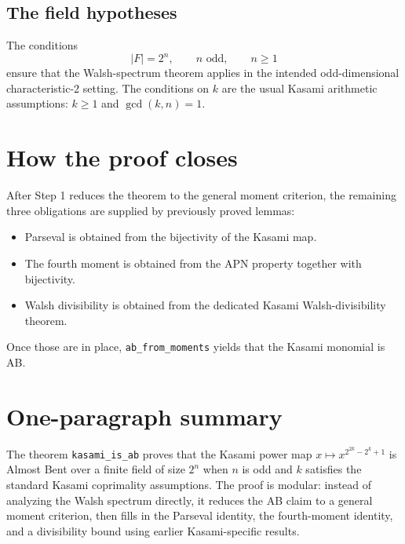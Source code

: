 \documentclass[11pt]{article}
\begin{document}
\subsection{The field hypotheses}
The conditions
\[
  |F| = 2^n, \qquad n \text{ odd}, \qquad n \ge 1
\]
ensure that the Walsh-spectrum theorem applies in the intended odd-dimensional characteristic-2 setting. The conditions on $k$ are the usual Kasami arithmetic assumptions: $k \ge 1$ and $\gcd(k,n)=1$.

\section{How the proof closes}
After Step 1 reduces the theorem to the general moment criterion, the remaining three obligations are supplied by previously proved lemmas:
\begin{itemize}
  \item Parseval is obtained from the bijectivity of the Kasami map.
  \item The fourth moment is obtained from the APN property together with bijectivity.
  \item Walsh divisibility is obtained from the dedicated Kasami Walsh-divisibility theorem.
\end{itemize}

Once those are in place, \texttt{ab\_from\_moments} yields that the Kasami monomial is AB.

\section{One-paragraph summary}
The theorem \texttt{kasami\_is\_ab} proves that the Kasami power map $x \mapsto x^{2^{2k} - 2^k + 1}$ is Almost Bent over a finite field of size $2^n$ when $n$ is odd and $k$ satisfies the standard Kasami coprimality assumptions. The proof is modular: instead of analyzing the Walsh spectrum directly, it reduces the AB claim to a general moment criterion, then fills in the Parseval identity, the fourth-moment identity, and a divisibility bound using earlier Kasami-specific results.
\end{document}
